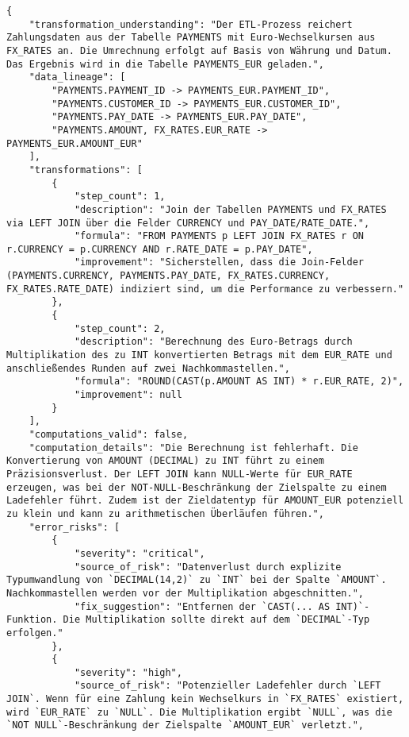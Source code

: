 \begin{lstlisting}[caption={Ausgabe: GEMINI 2.5 Pro Anwendungsfall 4 Hauptdurchlauf},label={gemini_case4_prompt1}]
{
    "transformation_understanding": "Der ETL-Prozess reichert Zahlungsdaten aus der Tabelle PAYMENTS mit Euro-Wechselkursen aus FX_RATES an. Die Umrechnung erfolgt auf Basis von Währung und Datum. Das Ergebnis wird in die Tabelle PAYMENTS_EUR geladen.",
    "data_lineage": [
        "PAYMENTS.PAYMENT_ID -> PAYMENTS_EUR.PAYMENT_ID",
        "PAYMENTS.CUSTOMER_ID -> PAYMENTS_EUR.CUSTOMER_ID",
        "PAYMENTS.PAY_DATE -> PAYMENTS_EUR.PAY_DATE",
        "PAYMENTS.AMOUNT, FX_RATES.EUR_RATE -> PAYMENTS_EUR.AMOUNT_EUR"
    ],
    "transformations": [
        {
            "step_count": 1,
            "description": "Join der Tabellen PAYMENTS und FX_RATES via LEFT JOIN über die Felder CURRENCY und PAY_DATE/RATE_DATE.",
            "formula": "FROM PAYMENTS p LEFT JOIN FX_RATES r ON r.CURRENCY = p.CURRENCY AND r.RATE_DATE = p.PAY_DATE",
            "improvement": "Sicherstellen, dass die Join-Felder (PAYMENTS.CURRENCY, PAYMENTS.PAY_DATE, FX_RATES.CURRENCY, FX_RATES.RATE_DATE) indiziert sind, um die Performance zu verbessern."
        },
        {
            "step_count": 2,
            "description": "Berechnung des Euro-Betrags durch Multiplikation des zu INT konvertierten Betrags mit dem EUR_RATE und anschließendes Runden auf zwei Nachkommastellen.",
            "formula": "ROUND(CAST(p.AMOUNT AS INT) * r.EUR_RATE, 2)",
            "improvement": null
        }
    ],
    "computations_valid": false,
    "computation_details": "Die Berechnung ist fehlerhaft. Die Konvertierung von AMOUNT (DECIMAL) zu INT führt zu einem Präzisionsverlust. Der LEFT JOIN kann NULL-Werte für EUR_RATE erzeugen, was bei der NOT-NULL-Beschränkung der Zielspalte zu einem Ladefehler führt. Zudem ist der Zieldatentyp für AMOUNT_EUR potenziell zu klein und kann zu arithmetischen Überläufen führen.",
    "error_risks": [
        {
            "severity": "critical",
            "source_of_risk": "Datenverlust durch explizite Typumwandlung von `DECIMAL(14,2)` zu `INT` bei der Spalte `AMOUNT`. Nachkommastellen werden vor der Multiplikation abgeschnitten.",
            "fix_suggestion": "Entfernen der `CAST(... AS INT)`-Funktion. Die Multiplikation sollte direkt auf dem `DECIMAL`-Typ erfolgen."
        },
        {
            "severity": "high",
            "source_of_risk": "Potenzieller Ladefehler durch `LEFT JOIN`. Wenn für eine Zahlung kein Wechselkurs in `FX_RATES` existiert, wird `EUR_RATE` zu `NULL`. Die Multiplikation ergibt `NULL`, was die `NOT NULL`-Beschränkung der Zielspalte `AMOUNT_EUR` verletzt.",

\end{lstlisting}
